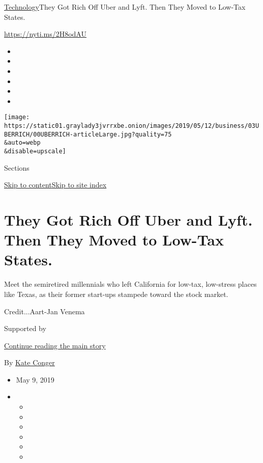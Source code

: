 \href{/section/technology}{Technology}\textbar{}They Got Rich Off Uber
and Lyft. Then They Moved to Low-Tax States.

\url{https://nyti.ms/2H8odAU}

\begin{itemize}
\item
\item
\item
\item
\item
\item
\end{itemize}

\texttt{[image: https://static01.graylady3jvrrxbe.onion/images/2019/05/12/business/03UBERRICH/00UBERRICH-articleLarge.jpg?quality=75\\\&auto=webp\\\&disable=upscale]}

Sections

\protect\hyperlink{site-content}{Skip to
content}\protect\hyperlink{site-index}{Skip to site index}

\hypertarget{they-got-rich-off-uber-and-lyft-then-they-moved-to-low-tax-states}{%
\section{They Got Rich Off Uber and Lyft. Then They Moved to Low-Tax
States.}\label{they-got-rich-off-uber-and-lyft-then-they-moved-to-low-tax-states}}

Meet the semiretired millennials who left California for low-tax,
low-stress places like Texas, as their former start-ups stampede toward
the stock market.

Credit...Aart-Jan Venema

Supported by

\protect\hyperlink{after-sponsor}{Continue reading the main story}

By \href{https://www.nytimes3xbfgragh.onion/by/kate-conger}{Kate Conger}

\begin{itemize}
\item
  May 9, 2019
\item
  \begin{itemize}
  \item
  \item
  \item
  \item
  \item
  \item
  \end{itemize}
\end{itemize}

